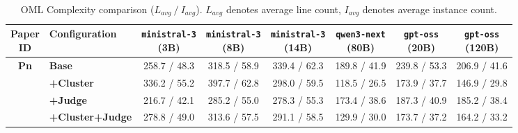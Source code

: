 \begin{table}[htbp]
    \centering
    \small
    \setlength{\tabcolsep}{4pt}
    \caption{OML Complexity comparison ($L_{avg}~/~I_{avg}$). $L_{avg}$ denotes average line count, $I_{avg}$ denotes average instance count.}
    \begin{tabular}{c|l|cccccc}
        \hline
        \makecell{\textbf{Paper} \\ \textbf{ID}} & \textbf{Configuration} & \makecell{\texttt{ministral-3} \\ (3B)} & \makecell{\texttt{ministral-3} \\ (8B)} & \makecell{\texttt{ministral-3} \\ (14B)} & \makecell{\texttt{qwen3-next} \\ (80B)} & \makecell{\texttt{gpt-oss} \\ (20B)} & \makecell{\texttt{gpt-oss} \\ (120B)} \\
        \hline
        
        \multirow{4}{*}{\textbf{Pn}} 
          & \textbf{Base} & 258.7 / 48.3 & 318.5 / 58.9 & 339.4 / 62.3 & 189.8 / 41.9 & 239.8 / 53.3 & 206.9 / 41.6\\
          & \textbf{+Cluster} & 336.2 / 55.2 & 397.7 / 62.8 & 298.0 / 59.5 & 118.5 / 26.5 & 173.9 / 37.7 & 146.9 / 29.8\\
          & \textbf{+Judge} & 216.7 / 42.1 & 285.2 / 55.0 & 278.3 / 55.3 & 173.4 / 38.6 & 187.3 / 40.9 & 185.2 / 38.4\\
          & \textbf{+Cluster+Judge} & 278.8 / 49.0 & 313.6 / 57.5 & 291.1 / 58.5 & 129.9 / 30.0 & 173.7 / 37.2 & 164.2 / 33.2\\
        \hline
        
    \end{tabular}
    \label{tab:complexity_pn}
\end{table}